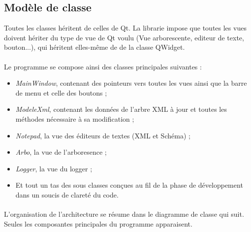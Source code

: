 \subsection{Modèle de classe}
Toutes les classes héritent de celles de Qt. La librarie impose que toutes les vues doivent hériter du type de vue de Qt voulu (Vue arborescente, editeur de texte, bouton...), qui héritent elles-même de de la classe QWidget.

\paragraph{}
Le programme se compose ainsi des classes principales suivantes :
\begin{itemize}
\item \emph{MainWindow}, contenant des pointeurs vers toutes les vues ainsi que la barre de menu et celle des boutons ;
\item \emph{ModeleXml}, contenant les données de l'arbre XML à jour et toutes les méthodes nécessaire à sa modification ;
\item \emph{Notepad}, la vue des éditeurs de textes (XML et Schéma) ;
\item \emph{Arbo}, la vue de l'arboresence ;
\item \emph{Logger}, la vue du logger ;
\item Et tout un tas des sous classes conçues au fil de la phase de développement dans un soucis de clareté du code.
\end{itemize}

\paragraph{}
L'organisation de l'architecture se résume dans le diagramme de classe qui suit. Seules les composantes principales du programme apparaisent.

